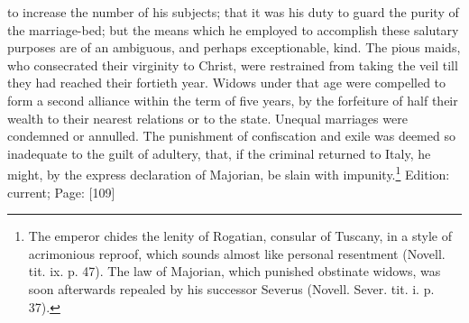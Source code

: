 to increase the number of his subjects; that it was his duty to guard the purity of the marriage-bed; but the means which he employed to accomplish these salutary purposes are of an ambiguous, and perhaps exceptionable, kind. The pious maids, who consecrated their virginity to Christ, were restrained from taking the veil till they had reached their fortieth year. Widows under that age were compelled to form a second alliance within the term of five years, by the forfeiture of half their wealth to their nearest relations or to the state. Unequal marriages were condemned or annulled. The punishment of confiscation and exile was deemed so inadequate to the guilt of adultery, that, if the criminal returned to Italy, he might, by the express declaration of Majorian, be slain with impunity.\footnote{The emperor chides the lenity of Rogatian, consular of Tuscany, in a style of acrimonious reproof, which sounds almost like personal resentment (Novell. tit. ix. p. 47). The law of Majorian, which punished obstinate widows, was soon afterwards repealed by his successor Severus (Novell. Sever. tit. i. p. 37).}
Edition: current; Page: [109]

